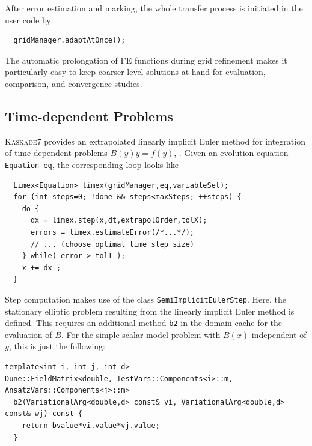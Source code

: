 \documentclass[11pt]{article}
\newcommand{\K}{\textsc{Kaskade7 }}
\begin{document}
After error estimation and marking, the whole transfer process is initiated in the user code by:
\begin{lstlisting}
  gridManager.adaptAtOnce();
\end{lstlisting}
The automatic prolongation of FE functions during grid refinement makes it particularly easy to keep coarser 
level solutions at hand for evaluation, comparison, and convergence studies.
\vspace{-2mm}
\subsection{Time-dependent Problems}
\K provides an extrapolated linearly implicit Euler method for integration of time-dependent problems 
$B(y)\dot{y} = f(y)$, \cite{DeuflhardNowak1987}. Given an evolution equation 
\verb?Equation eq?, the corresponding loop looks like

\begin{lstlisting}
  Limex<Equation> limex(gridManager,eq,variableSet);
  for (int steps=0; !done && steps<maxSteps; ++steps) {
    do {
      dx = limex.step(x,dt,extrapolOrder,tolX);
      errors = limex.estimateError(/*...*/);
      // ... (choose optimal time step size)
    } while( error > tolT );
    x += dx ;
  }
\end{lstlisting}
%
Step computation makes use of the class {\tt SemiImplicitEulerStep}. Here, the stationary elliptic problem 
resulting from the linearly implicit Euler method is defined. This requires an additional method {\tt b2} in 
the domain cache for the evaluation of $B$. For the simple scalar model problem with $B(x)$ independent of $y$, 
this is just the following:

\begin{lstlisting}
template<int i, int j, int d>
Dune::FieldMatrix<double, TestVars::Components<i>::m, AnsatzVars::Components<j>::m>
  b2(VariationalArg<double,d> const& vi, VariationalArg<double,d> const& wj) const {
    return bvalue*vi.value*vj.value;
  }
\end{lstlisting}
\end{document}
